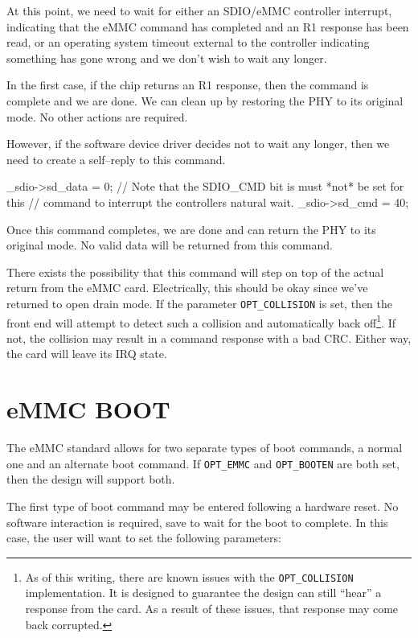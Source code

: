 \documentclass{gqtekspec}
\begin{document}
At this point, we need to wait for either an SDIO/eMMC controller interrupt,
indicating that the eMMC command has completed and an R1 response has been
read, or an operating system timeout external to the controller indicating
something has gone wrong and we don't wish to wait any longer.

In the first case, if the chip returns an R1 response, then the command is
complete and we are done.  We can clean up by restoring the PHY to its
original mode.  No other actions are required.

However, if the software device driver decides not to wait any longer,
then we need to create a self--reply to this command.

\begin{zCpp}
	_sdio->sd_data = 0;
	// Note that the SDIO_CMD bit is must *not* be set for this
	// command to interrupt the controllers natural wait.
	_sdio->sd_cmd  = 40;
\end{zCpp}

Once this command completes, we are done and can return the PHY to its original
mode.  No valid data will be returned from this command.

There exists the possibility that this command will step on top of the
actual return from the eMMC card.  Electrically, this should be okay since
we've returned to open drain mode.  If the parameter {\tt OPT\_COLLISION}
is set, then the front end will attempt to detect such a collision and
automatically back off\footnote{As of this writing, there are known issues
with the {\tt OPT\_COLLISION} implementation.  It is designed to guarantee
the design can still ``hear'' a response from the card.  As a result of these
issues, that response may come back corrupted.}.  If not, the collision may
result in a command response with a bad CRC.  Either way, the card will
leave its IRQ state.
\section{eMMC BOOT}
The eMMC standard allows for two separate types of boot commands, a normal one
and an alternate boot command.  If {\tt OPT\_EMMC} and {\tt OPT\_BOOTEN} are
both set, then the design will support both.

The first type of boot command may be entered following a hardware reset.
No software interaction is required, save to wait for the boot to complete.
In this case, the user will want to set the following parameters:
\end{document}
